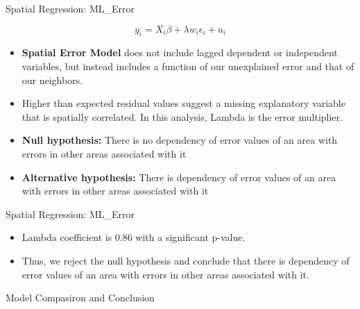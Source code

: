 \documentclass[10pt, aspectratio=169]{beamer}
\begin{document}
\begin{frame}{Spatial Regression: ML\_Error}

    \begin{equation}
        y_i=X_i \beta+\lambda w_i \epsilon_i+u_i
    \end{equation}

    \begin{itemize}

        \item \textbf{Spatial Error Model} does not include lagged dependent or independent variables, but instead includes a function of our unexplained error and that of our neighbors.
        \item \textbf{}Higher than expected residual values suggest a missing explanatory variable that is spatially correlated. In this analysis, Lambda is the error multiplier.
        \item \textbf{Null hypothesis:} There is no dependency of error values of an area with errors in other areas associated with it
        \item \textbf{Alternative hypothesis:} There is dependency of error values of an area with errors in other areas associated with it

    \end{itemize}
\end{frame}

\begin{frame}{Spatial Regression: ML\_Error}
    \small\begin{table}[!h]
        
        \caption{\label{tab:ml_error_summary} Estimation results of ML\_Error regression.}
    \end{table}
    \begin{itemize}

        \item \textbf{}Lambda coefficient is 0.86 with a significant p-value.
        \item \textbf{}Thus, we reject the null hypothesis and conclude that there is dependency of error values of an area with errors in other areas associated with it.

    \end{itemize}

\end{frame}

\begin{frame}{Model Compasiron and Conclusion}


    \small\begin{table}[!h]
        
        \caption{\label{tab:ml_lag_stats} Statistics of ML\_Lag model.}
    \end{table}

    \small\begin{table}[!h]
        
        \caption{\label{tab:ml_error_stats} Statistics of ML\_Error model.}
    \end{table}

\end{frame}
\end{document}
